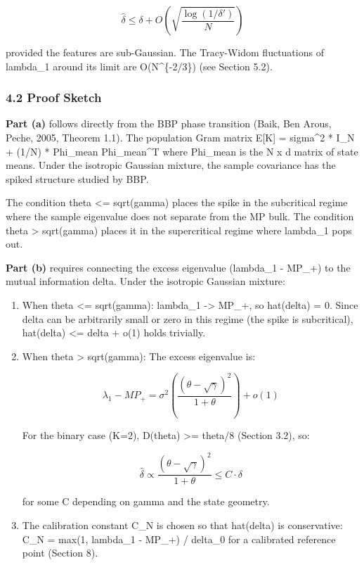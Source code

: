 \documentclass[
  12pt,
]{article}
\begin{document}
\[\hat{\delta} \leq \delta + O\left(\sqrt{\frac{\log(1/\delta')}{N}}\right)\]

provided the features are sub-Gaussian. The Tracy-Widom fluctuations of
lambda\_1 around its limit are O(N\^{}\{-2/3\}) (see Section 5.2).

\subsubsection{4.2 Proof Sketch}\label{proof-sketch}

\textbf{Part (a)} follows directly from the BBP phase transition (Baik,
Ben Arous, Peche, 2005, Theorem 1.1). The population Gram matrix
E{[}K{]} = sigma\^{}2 * I\_N + (1/N) * Phi\_mean Phi\_mean\^{}T where
Phi\_mean is the N x d matrix of state means. Under the isotropic
Gaussian mixture, the sample covariance has the spiked structure studied
by BBP.

The condition theta \textless= sqrt(gamma) places the spike in the
subcritical regime where the sample eigenvalue does not separate from
the MP bulk. The condition theta \textgreater{} sqrt(gamma) places it in
the supercritical regime where lambda\_1 pops out.

\textbf{Part (b)} requires connecting the excess eigenvalue (lambda\_1 -
MP\_+) to the mutual information delta. Under the isotropic Gaussian
mixture:

\begin{enumerate}
\def\labelenumi{\arabic{enumi}.}
\item
  When theta \textless= sqrt(gamma): lambda\_1 -\textgreater{} MP\_+, so
  hat(delta) = 0. Since delta can be arbitrarily small or zero in this
  regime (the spike is subcritical), hat(delta) \textless= delta + o(1)
  holds trivially.
\item
  When theta \textgreater{} sqrt(gamma): The excess eigenvalue is:

  \[\lambda_1 - MP_+ = \sigma^2 \left( \frac{(\theta - \sqrt{\gamma})^2}{1 + \theta} \right) + o(1)\]

  For the binary case (K=2), D(theta) \textgreater= theta/8 (Section
  3.2), so:

  \[\hat{\delta} \propto \frac{(\theta - \sqrt{\gamma})^2}{1 + \theta} \leq C \cdot \delta\]

  for some C depending on gamma and the state geometry.
\item
  The calibration constant C\_N is chosen so that hat(delta) is
  conservative: C\_N = max(1, lambda\_1 - MP\_+) / delta\_0 for a
  calibrated reference point (Section 8).
\end{enumerate}
\end{document}
